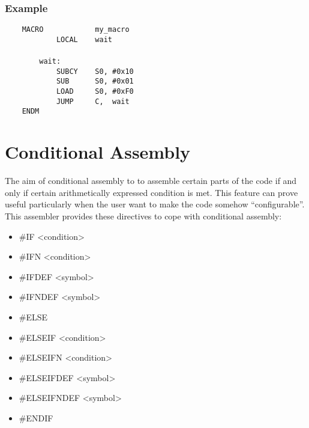             \subsubsection{Example}
                \verb'    MACRO            my_macro'\\
                \verb'            LOCAL    wait'\\
                \verb''\\
                \verb'        wait:'\\
                \verb'            SUBCY    S0, #0x10'\\
                \verb'            SUB      S0, #0x01' \\
                \verb'            LOAD     S0, #0xF0'\\
                \verb'            JUMP     C,  wait'\\
                \verb'    ENDM'

\clearpage
\section{Conditional Assembly}
    The aim of conditional assembly to to assemble certain parts of the code if and only if certain arithmetically expressed condition is met. This feature can prove useful particularly when the user want to make the code somehow ``configurable''. This assembler provides these directives to cope with conditional assembly:

    \begin{itemize}
        \item \#IF     <condition>
        \item \#IFN    <condition>
        \item \#IFDEF  <symbol>
        \item \#IFNDEF <symbol>
        \item \#ELSE
        \item \#ELSEIF     <condition>
        \item \#ELSEIFN    <condition>
        \item \#ELSEIFDEF  <symbol>
        \item \#ELSEIFNDEF <symbol>
        \item \#ENDIF
    \end{itemize}


